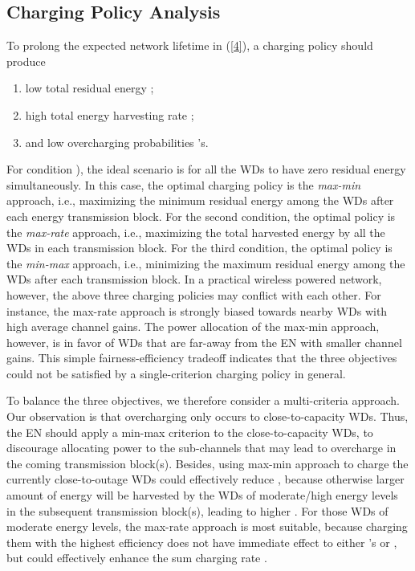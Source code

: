 \documentclass[conference]{IEEEtran}
\begin{document}
\subsection{Charging Policy Analysis}
To prolong the expected network lifetime in (\ref{4}), a charging policy  should produce
\begin{enumerate}
  \item low total residual energy ;
  \item high total energy harvesting rate ;
  \item and low overcharging probabilities 's.
\end{enumerate}
For condition ), the ideal scenario is for all the WDs to have zero residual energy simultaneously. In this case, the optimal charging policy is the \emph{max-min} approach, i.e., maximizing the minimum residual energy among the WDs after each energy transmission block. For the second condition, the optimal policy is the \emph{max-rate} approach, i.e., maximizing the total harvested energy by all the WDs in each transmission block. For the third condition, the optimal policy is the \emph{min-max} approach, i.e., minimizing the maximum residual energy among the WDs after each transmission block. In a practical wireless powered network, however, the above three charging policies may conflict with each other. For instance, the max-rate approach is strongly biased towards nearby WDs with high average channel gains. The power allocation of the max-min approach, however, is in favor of WDs that are far-away from the EN with smaller channel gains. This simple fairness-efficiency tradeoff indicates that the three objectives could not be satisfied by a single-criterion charging policy in general.

To balance the three objectives, we therefore consider a multi-criteria approach. Our observation is that overcharging only occurs to close-to-capacity WDs. Thus, the EN should apply a min-max criterion to the close-to-capacity WDs, to discourage allocating power to the sub-channels that may lead to overcharge in the coming transmission block(s). Besides, using max-min approach to charge the currently close-to-outage WDs could effectively reduce , because otherwise larger amount of energy will be harvested by the WDs of moderate/high energy levels in the subsequent transmission block(s), leading to higher . For those WDs of moderate energy levels, the max-rate approach is most suitable, because charging them with the highest efficiency does not have immediate effect to either 's or , but could effectively enhance the sum charging rate .
\end{document}
